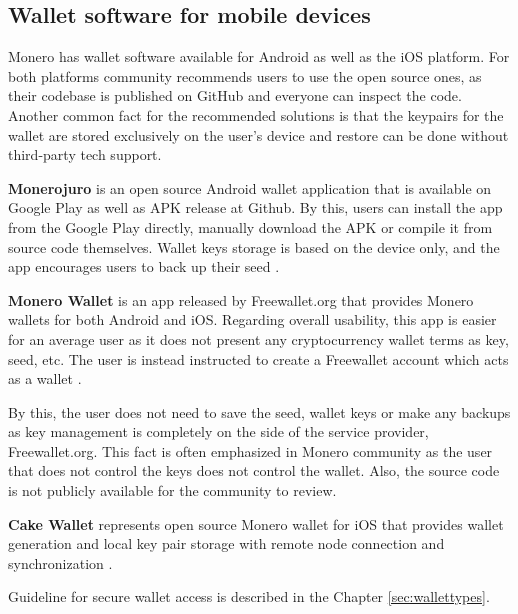 \documentclass[
  printed, %
  table,   %
  nolof,     %
  nolot,     %
           oneside, color
]{fithesis3}
\begin{document}
\subsection{Wallet software for mobile devices}

Monero has wallet software available for Android as well as the iOS platform. For both platforms community recommends users to use the open source ones, as their codebase is published on GitHub and everyone can inspect the code. Another common fact for the recommended solutions is that the keypairs for the wallet are stored exclusively on the user's device and restore can be done without third-party tech support.

\textbf{Monerojuro} is an open source Android wallet application that is available on Google Play as well as APK release at Github. By this, users can install the app from the Google Play directly, manually download the APK or compile it from source code themselves. Wallet keys storage is based on the device only, and the app encourages users to back up their seed \cite{xmrwalletgithub}.

\textbf{Monero Wallet} is an app released by Freewallet.org that provides Monero wallets for both Android and iOS. Regarding overall usability, this app is easier for an average user as it does not present any cryptocurrency wallet terms as key, seed, etc. The user is instead instructed to create a Freewallet account which acts as a wallet \cite{freewallet}. 

By this, the user does not need to save the seed, wallet keys or make any backups as key management is completely on the side of the service provider, Freewallet.org. This fact is often emphasized in Monero community as the user that does not control the keys does not control the wallet. Also, the source code is not publicly available for the community to review.

\textbf{Cake Wallet} represents open source Monero wallet for iOS that provides wallet generation and local key pair storage with remote node connection and synchronization \cite{cakewalletgithub}.

Guideline for secure wallet access is described in the Chapter \ref{sec:wallettypes}. 
\end{document}
